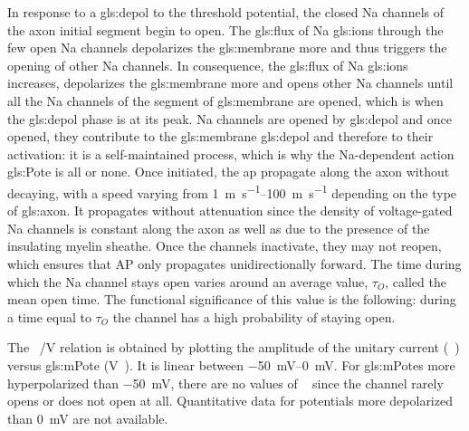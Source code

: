 \documentclass[../../Orator]{subfiles}
\begin{document}
In response to a \gls{gls:depol} to the threshold potential, the closed \gls{Na} channels of the axon initial segment begin to open. The \gls{gls:flux} of \gls{Na} \glspl{gls:ion} through the few open \gls{Na} channels depolarizes the \gls{gls:membrane} more and thus triggers the opening of other \gls{Na} channels. In consequence, the \gls{gls:flux} of \gls{Na} \glspl{gls:ion} increases, depolarizes the \gls{gls:membrane} more and opens other \gls{Na} channels until all the \gls{Na} channels of the segment of \gls{gls:membrane} are opened, which is when the \gls{gls:depol} phase is at its peak. \gls{Na} channels are opened by \gls{gls:depol} and once opened, they contribute to the \gls{gls:membrane} \gls{gls:depol} and therefore to their activation: it is a self-maintained process, which is why the  \gls{Na}-dependent  action  \gls{gls:Pote}  is  all  or  none. Once initiated, the \gls{ap} propagate along the axon without decaying, with a speed varying from \qtyrange{1}{100}{\m\per\s} depending on the type of \gls{gls:axon}.  It  propagates  without  attenuation  since  the  density of voltage-gated \gls{Na} channels is constant along the  axon as well as due to the presence of the insulating myelin sheathe.  Once the channels inactivate, they may not reopen, which ensures that AP only propagates  unidirectionally forward. 
The time during which the \gls{Na} channel stays open varies around an average value, \(\tau_O\), called the mean open time. The functional significance of this value is the following: during a time equal to \(\tau_O\) the channel has a high probability of staying open. 

The \unit[per-mode = symbol]{\cur\sodium\per\V} relation is obtained by plotting the amplitude of the unitary current (\unit{\cur\sodium}) versus \gls{gls:mPote} (\unit{\V\membrane}). It is linear between \qtyrange{-50}{0}{\mV}. For \glspl{gls:mPote} more hyperpolarized than \qty{-50}{\mV}, there are no values of \unit{\cur\sodium} since the channel rarely opens or does not open at all. Quantitative data for potentials more depolarized than \qty{0}{\mV} are not available.
\end{document}
